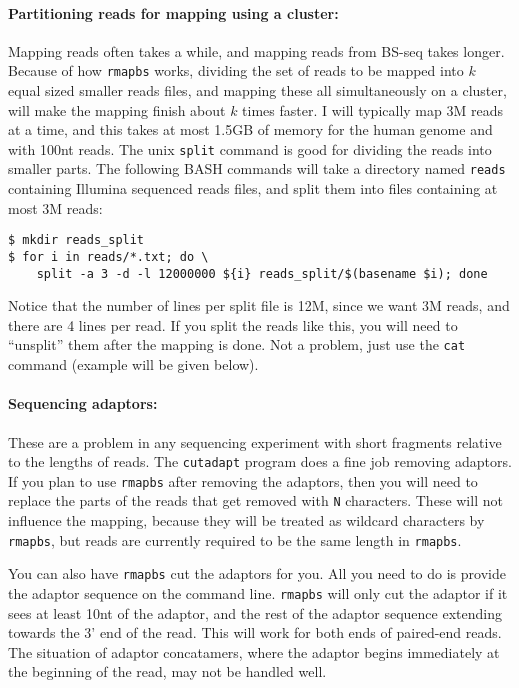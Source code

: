 \documentclass[10pt]{article}
\newcommand{\prog}[1]{\texttt{#1}}
\newcommand{\fn}[1]{\texttt{#1}}
\newcommand{\lit}[1]{\texttt{#1}}
\begin{document}
\paragraph{Partitioning reads for mapping using a cluster:} Mapping
reads often takes a while, and mapping reads from BS-seq takes longer.
Because of how \prog{rmapbs} works, dividing the set of reads to be
mapped into $k$ equal sized smaller reads files, and mapping these all
simultaneously on a cluster, will make the mapping finish about $k$
times faster. I will typically map 3M reads at a time, and this takes
at most 1.5GB of memory for the human genome and with 100nt reads. The
unix \prog{split} command is good for dividing the reads into smaller
parts. The following BASH commands will take a directory named
\fn{reads} containing Illumina sequenced reads files, and split
them into files containing at most 3M reads:
\begin{verbatim}
$ mkdir reads_split
$ for i in reads/*.txt; do \
    split -a 3 -d -l 12000000 ${i} reads_split/$(basename $i); done
\end{verbatim}
Notice that the number of lines per split file is 12M, since we want
3M reads, and there are 4 lines per read. If you split the reads like
this, you will need to ``unsplit'' them after the mapping is done. Not a
problem, just use the \prog{cat} command (example will be given
below).

\paragraph{Sequencing adaptors:} These are a problem in any sequencing
experiment with short fragments relative to the lengths of reads.  The
\prog{cutadapt} program does a fine job removing adaptors. If you plan
to use \prog{rmapbs} after removing the adaptors, then you will need to
replace the parts of the reads that get removed with \lit{N} characters.
These will not influence the mapping, because they will be treated as
wildcard characters by \prog{rmapbs}, but reads are currently required
to be the same length in \prog{rmapbs}.

You can also have \prog{rmapbs} cut the adaptors for you. All you need
to do is provide the adaptor sequence on the command
line. \prog{rmapbs} will only cut the adaptor if it sees at least 10nt
of the adaptor, and the rest of the adaptor sequence extending towards
the 3' end of the read. This will work for both ends of paired-end
reads. The situation of adaptor concatamers, where the adaptor begins
immediately at the beginning of the read, may not be handled well.
\end{document}

